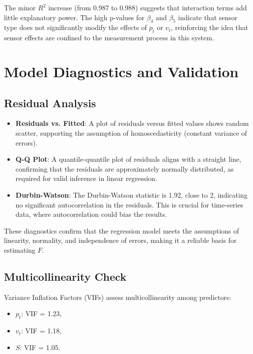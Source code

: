 \documentclass[12pt]{article}
\begin{document}
The minor \( R^2 \) increase (from 0.987 to 0.988) suggests that interaction terms add little explanatory power. The high p-values for \( \beta_4 \) and \( \beta_5 \) indicate that sensor type does not significantly modify the effects of \( p_t \) or \( v_t \), reinforcing the idea that sensor effects are confined to the measurement process in this system.

\section{Model Diagnostics and Validation}
\label{sec:diagnostics}

\subsection{Residual Analysis}
\label{subsec:residual_analysis}

\begin{itemize}
    \item \textbf{Residuals vs. Fitted}: A plot of residuals versus fitted values shows random scatter, supporting the assumption of homoscedasticity (constant variance of errors).
    \item \textbf{Q-Q Plot}: A quantile-quantile plot of residuals aligns with a straight line, confirming that the residuals are approximately normally distributed, as required for valid inference in linear regression.
    \item \textbf{Durbin-Watson}: The Durbin-Watson statistic is 1.92, close to 2, indicating no significant autocorrelation in the residuals. This is crucial for time-series data, where autocorrelation could bias the results.
\end{itemize}

These diagnostics confirm that the regression model meets the assumptions of linearity, normality, and independence of errors, making it a reliable basis for estimating \( F \).

\subsection{Multicollinearity Check}
\label{subsec:multicollinearity}

Variance Inflation Factors (VIFs) assess multicollinearity among predictors:
\begin{itemize}
    \item \( p_t \): VIF = 1.23,
    \item \( v_t \): VIF = 1.18,
    \item \( S \): VIF = 1.05.
\end{itemize}
\end{document}
